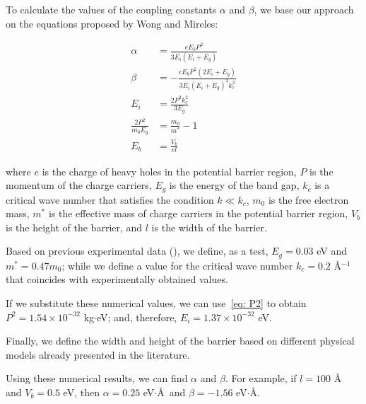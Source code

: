 To calculate the values of the coupling constants $\alpha$ and $\beta$, we base our approach on the equations proposed by Wong and Mireles\cite{WongUNAM2005}:

\begin{align}
    \alpha &= \frac{eE_b P^2}{3E_i\left( E_i + E_g \right)}\label{eq: alfa}\\
    \beta &= -\frac{eE_b P^2\left( 2E_i + E_g \right)}{3E_i\left( E_i + E_g \right)^2 k_c^2}\label{eq: beta}\\
    E_i &= \frac{2P^2 k_c^2}{3E_g} \label{eq: E_i}\\
    \frac{2P^2}{m_0 E_g} &= \frac{m_0}{m^*} - 1 \label{eq: P2}\\
    E_b &= \frac{V_b}{el} \label{eq: E_b}
\end{align}

\noindent where $e$ is the charge of heavy holes in the potential barrier region, $P$ is the momentum of the charge carriers, $E_g$ is the energy of the band gap, $k_c$ is a critical wave number that satisfies the condition $k \ll k_c$, $m_0$ is the free electron mass, $m^*$ is the effective mass of charge carriers in the potential barrier region, $V_b$ is the height of the barrier, and $l$ is the width of the barrier.

Based on previous experimental data (\cite{HuntSci2013, FuhrerSci2013, PallaBullMaterSci2016}), we define, as a test, $E_g = 0.03$ eV and $m^* = 0.47m_0$; while we define a value for the critical wave number $k_c = 0.2$ \AA$^{-1}$ that coincides with experimentally obtained values.

If we substitute these numerical values, we can use~\eqref{eq: P2} to obtain $P^2=1.54\times10^{-32}$ kg$\cdot$eV; and, therefore, $E_i = 1.37\times10^{-32}$ eV\@.

Finally, we define the width and height of the barrier based on different physical models already presented in the literature.

Using these numerical results, we can find $\alpha$ and $\beta$.
For example, if $l=100$ \AA\, and $V_b = 0.5$ eV, then $\alpha = 0.25$ eV$\cdot$\AA\, and $\beta = -1.56$ eV$\cdot$\AA.


